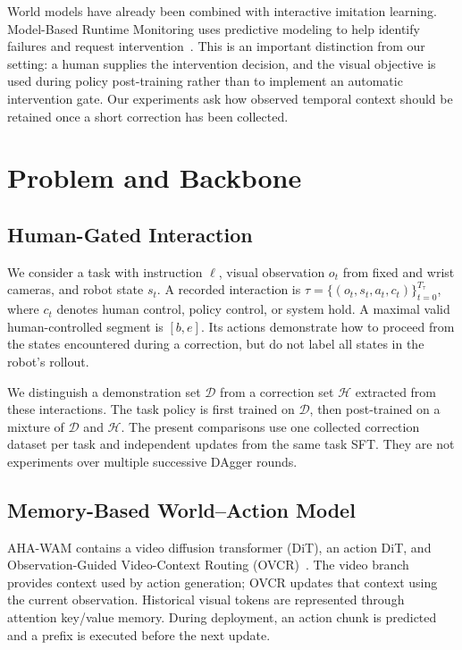 \documentclass[letterpaper,10pt,conference]{ieeeconf}
\begin{document}
World models have already been combined with interactive imitation learning. Model-Based Runtime Monitoring uses predictive modeling to help identify failures and request intervention~\cite{monitor}. This is an important distinction from our setting: a human supplies the intervention decision, and the visual objective is used during policy post-training rather than to implement an automatic intervention gate. Our experiments ask how observed temporal context should be retained once a short correction has been collected.

\section{Problem and Backbone}
\subsection{Human-Gated Interaction}
We consider a task with instruction $\ell$, visual observation $o_t$ from fixed and wrist cameras, and robot state $s_t$. A recorded interaction is $\tau=\{(o_t,s_t,a_t,c_t)\}_{t=0}^{T_\tau}$, where $c_t$ denotes human control, policy control, or system hold. A maximal valid human-controlled segment is $[b,e]$. Its actions demonstrate how to proceed from the states encountered during a correction, but do not label all states in the robot's rollout.

We distinguish a demonstration set $\mathcal D$ from a correction set $\mathcal H$ extracted from these interactions. The task policy is first trained on $\mathcal D$, then post-trained on a mixture of $\mathcal D$ and $\mathcal H$. The present comparisons use one collected correction dataset per task and independent updates from the same task SFT. They are not experiments over multiple successive DAgger rounds.

\subsection{Memory-Based World--Action Model}
AHA-WAM contains a video diffusion transformer (DiT), an action DiT, and Observation-Guided Video-Context Routing (OVCR)~\cite{ahawam}. The video branch provides context used by action generation; OVCR updates that context using the current observation. Historical visual tokens are represented through attention key/value memory. During deployment, an action chunk is predicted and a prefix is executed before the next update.
\end{document}
